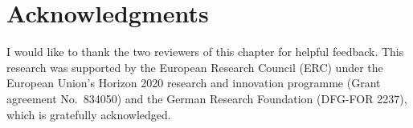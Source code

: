 \documentclass[output=paper,hidelinks]{langscibook}
\begin{document}
\section*{Acknowledgments}

I would like to thank the two reviewers of this chapter for helpful feedback. This
research was supported by the European Research Council (ERC) under the European Union's
Horizon 2020 research and innovation programme (Grant agreement No.\ 834050) and the
German Research Foundation (DFG-FOR 2237), which is gratefully acknowledged.

{\printbibliography[heading=subbibliography,notkeyword=this]}
\end{document}
